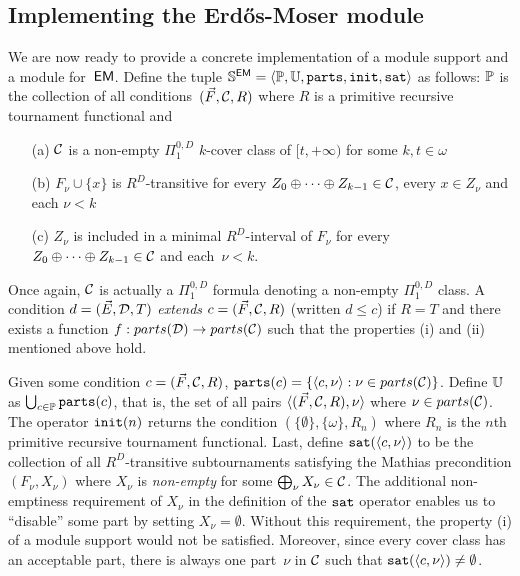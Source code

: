 \subsection{Implementing the Erd\H{o}s-Moser module}

We are now ready to provide a concrete implementation of a module support and a module for~$\operatorname{\sf{EM}}$.
Define the tuple $\mathbb{S}^{\operatorname{\sf{EM}}} = \left\langle \mathbb{P}, \mathbb{U}, \mathtt{parts}, \mathtt{init}, \mathtt{sat} \right\rangle$ as follows:
$\mathbb{P}$ is the collection of all conditions~$(\vec{F}, \mathcal{C}, R)$ where $R$ is a primitive recursive
tournament functional and
\begin{itemize}
	\item[(a)] $\mathcal{C}$ is a non-empty $\Pi^{0,D}_1$ $k$-cover class of $[t, +\infty)$ 
	for some $k, t \in \omega$
	\item[(b)] $F_\nu \cup \{x\}$ is $R^D$-transitive for every $Z_0 \oplus \dots \oplus Z_{k-1} \in \mathcal{C}$,
	every $x \in Z_\nu$ and each $\nu < k$
	\item[(c)] $Z_\nu$ is included in a minimal $R^D$-interval of $F_\nu$
	for every $Z_0 \oplus \dots \oplus Z_{k-1} \in \mathcal{C}$ and each~$\nu < k$.
\end{itemize}
Once again, $\mathcal{C}$ is actually a $\Pi^{0,D}_1$ formula denoting a non-empty $\Pi^{0,D}_1$ class.
A condition $d = (\vec{E}, \mathcal{D}, T)$ \emph{extends} 
$c = (\vec{F}, \mathcal{C}, R)$
(written $d \leq c$) if $R = T$ and
there exists a function $f : parts(\mathcal{D}) \to parts(\mathcal{C})$ such that the properties (i) and (ii)
mentioned above hold.

Given some condition $c = (\vec{F}, \mathcal{C}, R)$,
$\mathtt{parts}(c) = \{\left\langle c, \nu \right\rangle : \nu \in parts(\mathcal{C})\}$.
Define $\mathbb{U}$ as $\bigcup_{c \in \mathbb{P}} \mathtt{parts}(c)$, that is, the set of all pairs $\langle (\vec{F}, \mathcal{C}, R), \nu \rangle$
where $\nu \in parts(\mathcal{C})$. The operator $\mathtt{init}(n)$ returns the condition $(\{\emptyset\}, \{\omega\}, R_n)$
where $R_n$ is the $n$th primitive recursive tournament functional.
Last, define $\mathtt{sat}(\left\langle c, \nu \right\rangle)$ to be the collection of all $R^D$-transitive subtournaments
satisfying the Mathias precondition $(F_\nu, X_\nu)$ where $X_\nu$ is \emph{non-empty} for some $\bigoplus_\nu X_\nu \in \mathcal{C}$.
The additional non-emptiness requirement of $X_\nu$ in the definition of the $\mathtt{sat}$ operator
enables us to ``disable'' some part by setting $X_\nu = \emptyset$. Without this requirement,
the property (i) of a module support would not be satisfied. Moreover, since every cover class has an
acceptable part, there is always one part~$\nu$ in $\mathcal{C}$ such that $\mathtt{sat}(\left\langle c,\nu \right\rangle) \neq \emptyset$.

